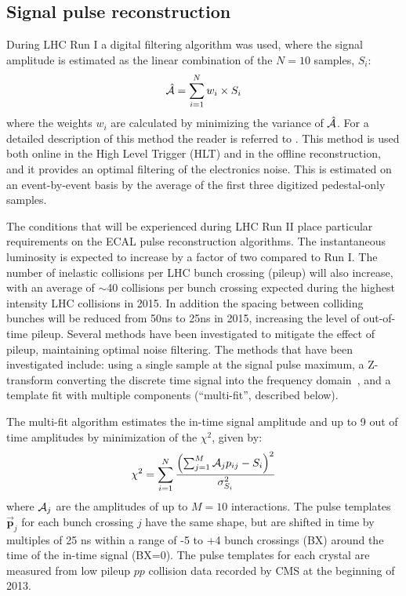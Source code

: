 \documentclass[journal]{IEEEtran}
\begin{document}
\subsection{Signal pulse reconstruction}
\label{sec:amplitudereco}
During LHC Run I a digital filtering algorithm was used, where the signal amplitude is estimated as the linear combination of the $N=10$ samples, $S_i$:
%
\begin{equation}
\hat{\cal A}=\sum_{i=1}^{N} w_i \times S_i
\end{equation}
%
where the weights $w_i$ are calculated by minimizing the variance of $\hat{\cal A}$. For a detailed description of this method the reader is referred to \cite{Bruneliere:2006ra}. This method is used both online in the High Level Trigger (HLT) and in the offline reconstruction, and it provides an optimal filtering of the electronics noise. This is estimated on an event-by-event basis by the average of the first three digitized pedestal-only samples.

The conditions that will be experienced during LHC Run II place particular requirements on the ECAL pulse reconstruction algorithms. The instantaneous luminosity is expected to increase by a factor of two compared to Run I. The number of inelastic collisions per LHC bunch crossing (pileup) will also increase, with an average of $\sim$40 collisions per bunch crossing expected during the highest intensity LHC collisions in 2015. In addition the spacing between colliding bunches will be reduced from 50ns to 25ns in 2015, increasing the level of out-of-time pileup. Several methods have been investigated to mitigate the effect of pileup, maintaining optimal noise filtering. The methods that have been investigated include: using a single sample at the signal pulse maximum, a Z-transform converting the discrete time signal into the frequency domain~\cite{Gadomski:1992xu}, and a template fit with multiple components (``multi-fit'', described below).  

The multi-fit algorithm estimates the in-time signal amplitude and up to 9 out of time amplitudes by minimization of the $\chi^2$, given by:
\begin{equation}
\label{eqn:chi2multifit}
\chi^2 = \sum_{i=1}^{N} \frac{\left(\sum_{j=1}^M {\cal A}_{j}p_{ij} - S_i \right)^2}{\sigma^2_{S_i}}
\end{equation}
where ${\cal A}_{j}$ are the amplitudes of up to $M=10$ interactions. The pulse templates $\mathbf{\vec p}_j$ for each bunch crossing $j$ have the same shape, but are shifted in time by multiples of 25 ns within a range of -5 to +4 bunch crossings (BX) around the time of the in-time signal (BX=0). The pulse templates for each crystal are measured from low pileup $pp$ collision data recorded by CMS at the beginning of 2013. 
\end{document}
